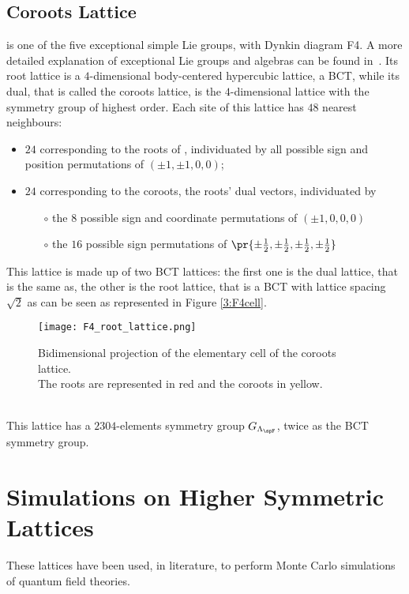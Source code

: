 \subsection{\spFtext Coroots Lattice}
\spFtext is one of the five exceptional simple Lie groups, with Dynkin diagram \dynkin F4.
A more detailed explanation of exceptional Lie groups and algebras can be found in~\cite{adams1996lectures}.
Its root lattice is a $4$-dimensional body-centered hypercubic lattice, a BCT, while its dual, that is called the \spFtext coroots lattice, is the $4$-dimensional lattice with the symmetry group of highest order.
Each site of this lattice has $48$ nearest neighbours:
\begin{itemize}
    \item $24$ corresponding to the roots of \spFtext, individuated by all possible sign and position permutations of $(\pm1,\pm1,0,0)$;\
    \item $24$ corresponding to the coroots, the roots' dual vectors, individuated by\
    \begin{itemize}
        \item[$\circ$] the $8$ possible sign and coordinate permutations of $(\pm1,0,0,0)$\
        \item[$\circ$] the $16$ possible sign permutations of $\pr{\pm\frac12,\pm\frac12,\pm\frac12,\pm\frac12}$\
    \end{itemize}
\end{itemize}
This lattice is made up of two BCT lattices: the first one is the dual lattice, that is the same as, the other is the root lattice, that is a BCT with lattice spacing $\sqrt2$ as can be seen as represented in Figure \eqref{3:F4cell}.
\begin{figure}[!htbp]
    \centering
    \texttt{[image: F4\_root\_lattice.png]}
    \caption{Bidimensional projection of the elementary cell of the \spFtext coroots lattice.\\
             The roots are represented in red and the coroots in yellow.}
    \label{3:F4cell}
\end{figure}\\
This lattice has a $2304$-elements symmetry group $G_{\Lambda_{\spF}}$, twice as the BCT symmetry group.

\section{Simulations on Higher Symmetric Lattices}
These lattices have been used, in literature, to perform Monte Carlo simulations of quantum field theories.

